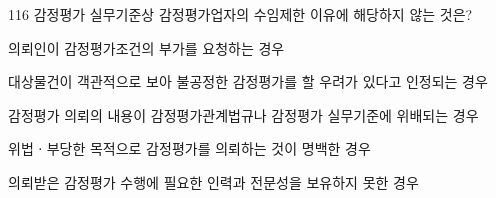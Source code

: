 \begin{question}{116}
감정평가 실무기준상 감정평가업자의 수임제한 이유에 해당하지 않는 것은?
\begin{choices}
  \item 의뢰인이 감정평가조건의 부가를 요청하는 경우
  \item 대상물건이 객관적으로 보아 불공정한 감정평가를 할 우려가 있다고 인정되는 경우
  \item 감정평가 의뢰의 내용이 감정평가관계법규나 감정평가 실무기준에 위배되는 경우
  \item 위법ㆍ부당한 목적으로 감정평가를 의뢰하는 것이 명백한 경우
  \item 의뢰받은 감정평가 수행에 필요한 인력과 전문성을 보유하지 못한 경우
\end{choices}
\end{question}
